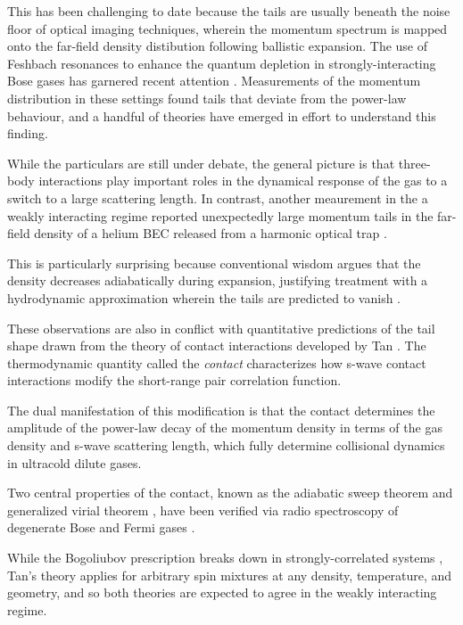 	This has been challenging to date because the tails are usually beneath the noise floor of optical imaging techniques, wherein the momentum spectrum is mapped onto the far-field density distibution following ballistic expansion.
	The use of Feshbach resonances to enhance the quantum depletion in strongly-interacting Bose gases has garnered recent attention \cite{Makotyn14,Fletcher17,Eigen18}.
	Measurements of the momentum distribution in these settings \cite{Makotyn14,Eigen18} found tails that deviate from the power-law behaviour, and a handful of theories have emerged \cite{Kira15_coherent,Colussi20,Smith14} in effort to understand this finding.
	
	While the particulars are still under debate, the general picture is that three-body interactions play important roles in the dynamical response of the gas to a switch to a large scattering length.
	In contrast, another meaurement in the a weakly interacting regime reported unexpectedly large momentum tails in the far-field density of a helium BEC released from a harmonic optical trap \cite{Chang16}.
	
	This is particularly surprising because conventional wisdom argues that the density decreases adiabatically during expansion, justifying treatment with a hydrodynamic approximation wherein the tails are predicted to vanish \cite{Qu16}.
	

	These observations are also in conflict with quantitative predictions of the tail shape drawn from the theory of contact interactions developed by Tan \cite{Tan08_energetics,Tan08_momentum,Tan08_virial}.
	The thermodynamic quantity called the \emph{contact} characterizes how s-wave contact interactions modify the short-range pair correlation function.
	
	The dual manifestation of this modification is that the contact determines the amplitude of the power-law decay of the momentum density in terms of the gas density and s-wave scattering length, which fully determine collisional dynamics in ultracold dilute gases.
	
	Two central properties of the contact, known as the adiabatic sweep theorem and generalized virial theorem \cite{Tan08_momentum,Tan08_virial}, have been verified via radio spectroscopy \cite{Baym07,Punk07,Braaten10} of degenerate Bose \cite{Wild12} and Fermi gases \cite{Stewart10,sagi12}.
	
	While the Bogoliubov prescription breaks down in strongly-correlated systems \cite{Lopes17_quasiparticle}, Tan’s theory applies for arbitrary spin mixtures at any density, temperature, and geometry, and so both theories are expected to agree in the weakly interacting regime.

